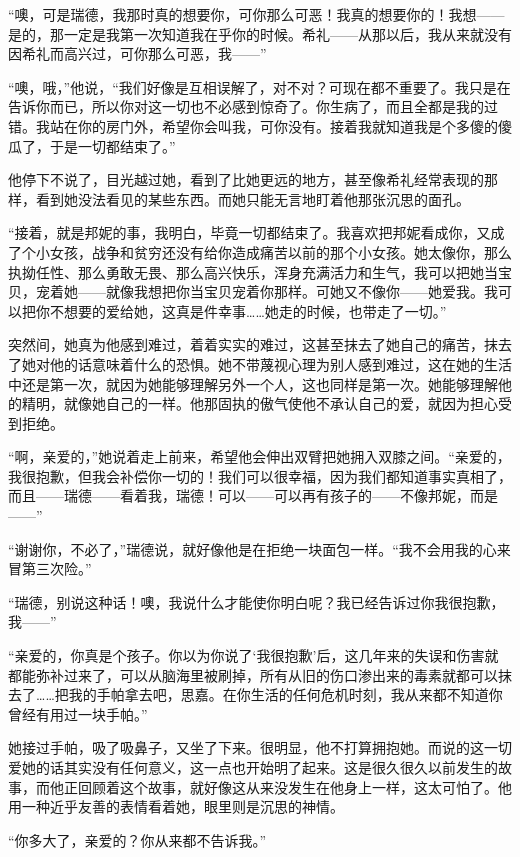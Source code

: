 \par “噢，可是瑞德，我那时真的想要你，可你那么可恶！我真的想要你的！我想——是的，那一定是我第一次知道我在乎你的时候。希礼——从那以后，我从来就没有因希礼而高兴过，可你那么可恶，我——”
\par “噢，哦，”他说，“我们好像是互相误解了，对不对？可现在都不重要了。我只是在告诉你而已，所以你对这一切也不必感到惊奇了。你生病了，而且全都是我的过错。我站在你的房门外，希望你会叫我，可你没有。接着我就知道我是个多傻的傻瓜了，于是一切都结束了。”
\par 他停下不说了，目光越过她，看到了比她更远的地方，甚至像希礼经常表现的那样，看到她没法看见的某些东西。而她只能无言地盯着他那张沉思的面孔。
\par “接着，就是邦妮的事，我明白，毕竟一切都结束了。我喜欢把邦妮看成你，又成了个小女孩，战争和贫穷还没有给你造成痛苦以前的那个小女孩。她太像你，那么执拗任性、那么勇敢无畏、那么高兴快乐，浑身充满活力和生气，我可以把她当宝贝，宠着她——就像我想把你当宝贝宠着你那样。可她又不像你——她爱我。我可以把你不想要的爱给她，这真是件幸事……她走的时候，也带走了一切。”
\par 突然间，她真为他感到难过，着着实实的难过，这甚至抹去了她自己的痛苦，抹去了她对他的话意味着什么的恐惧。她不带蔑视心理为别人感到难过，这在她的生活中还是第一次，就因为她能够理解另外一个人，这也同样是第一次。她能够理解他的精明，就像她自己的一样。他那固执的傲气使他不承认自己的爱，就因为担心受到拒绝。
\par “啊，亲爱的，”她说着走上前来，希望他会伸出双臂把她拥入双膝之间。“亲爱的，我很抱歉，但我会补偿你一切的！我们可以很幸福，因为我们都知道事实真相了，而且——瑞德——看着我，瑞德！可以——可以再有孩子的——不像邦妮，而是——”
\par “谢谢你，不必了，”瑞德说，就好像他是在拒绝一块面包一样。“我不会用我的心来冒第三次险。”
\par “瑞德，别说这种话！噢，我说什么才能使你明白呢？我已经告诉过你我很抱歉，我——”
\par “亲爱的，你真是个孩子。你以为你说了‘我很抱歉’后，这几年来的失误和伤害就都能弥补过来了，可以从脑海里被刷掉，所有从旧的伤口渗出来的毒素就都可以抹去了……把我的手帕拿去吧，思嘉。在你生活的任何危机时刻，我从来都不知道你曾经有用过一块手帕。”
\par 她接过手帕，吸了吸鼻子，又坐了下来。很明显，他不打算拥抱她。而说的这一切爱她的话其实没有任何意义，这一点也开始明了起来。这是很久很久以前发生的故事，而他正回顾着这个故事，就好像这从来没发生在他身上一样，这太可怕了。他用一种近乎友善的表情看着她，眼里则是沉思的神情。
\par “你多大了，亲爱的？你从来都不告诉我。”
